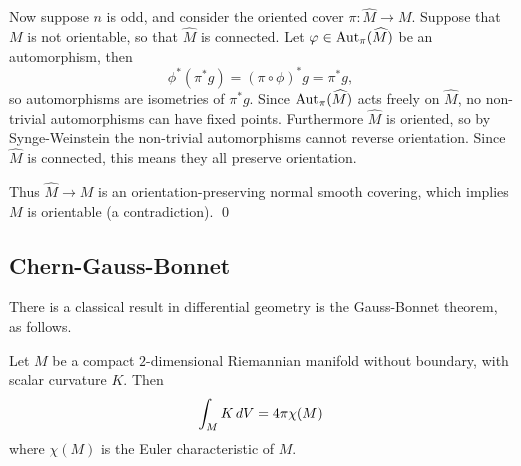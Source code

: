     Now suppose $n$ is odd, and consider the oriented cover $\pi\colon\hat M\to M$.
    Suppose that $M$ is not orientable, so that $\hat M$ is connected.
    Let $\varphi\in{\rm Aut}_\pi(\widehat M)$ be an automorphism, then
    $$ \phi^*(\pi^*g) = (\pi\circ\phi)^*g = \pi^*g , $$
    so automorphisms are isometries of $\pi^*g$.
    Since ${\rm Aut}_\pi(\widehat M)$ acts freely on $\hat M$, no non-trivial automorphisms can have fixed points.
    Furthermore $\hat M$ is oriented, so by Synge-Weinstein the non-trivial automorphisms cannot reverse orientation.
    Since $\hat M$ is connected, this means they all preserve orientation.

    Thus $\hat M\to M$ is an orientation-preserving normal smooth covering, which implies $M$ is orientable (a contradiction).
    \qed

\eproof

\subsection{Chern-Gauss-Bonnet}

There is a classical result in differential geometry is the {\emphcolor Gauss-Bonnet theorem}, as follows.

\bthrm[title={Gauss-Bonnet}]

    Let $M$ be a compact $2$-dimensional Riemannian manifold without boundary, with scalar curvature $K$.
    Then
    $$ \int_M K\mathop{}\!d V = 4\pi\chi(M) $$
    where $\chi(M)$ is the {\emphcolor Euler characteristic} of $M$.

\ethrm


